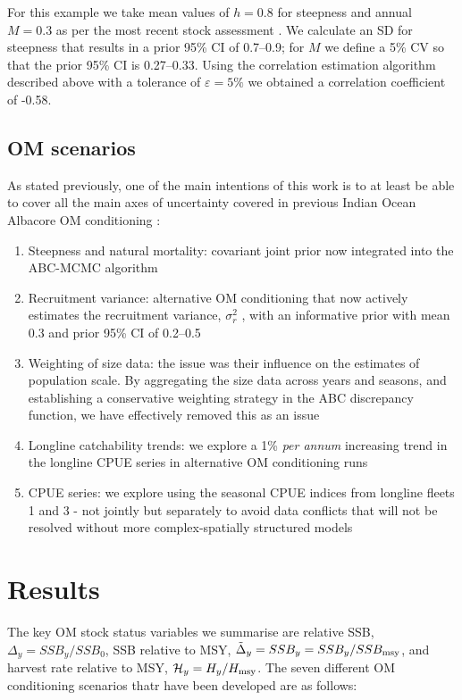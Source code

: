 \documentclass[11pt]{article}
\newcommand{\veps}{\varepsilon}
\newcommand{\sigr}{\sigma^2_r}
\begin{document}
For this example we take mean values of $h = 0.8$ for steepness and annual $M = 0.3$ as per the most recent stock assessment \cite{albsa}. We calculate an SD for steepness that results in a prior 95\% CI of 0.7--0.9; for $M$ we define a 5\% CV so that the prior 95\% CI is 0.27--0.33. Using the correlation estimation algorithm described above with a tolerance of $\veps = 5\%$ we obtained a correlation coefficient of -0.58.

\subsection{OM scenarios}

As stated previously, one of the main intentions of this work is to at least be able to cover all the main axes of uncertainty covered in previous Indian Ocean Albacore OM conditioning \cite{alb}:

\begin{enumerate}
    \item Steepness and natural mortality: covariant joint prior now integrated into the ABC-MCMC algorithm
    \item Recruitment variance: alternative OM conditioning that now actively estimates the recruitment variance, $\sigr$ , with an informative prior with mean 0.3 and prior 95\% CI of 0.2--0.5
    \item Weighting of size data: the issue was their influence on the estimates of population scale. By aggregating the size data across years and seasons, and establishing a conservative weighting strategy in the ABC discrepancy function, we have effectively removed this as an issue
    \item Longline catchability trends: we explore a 1\% \textit{per annum} increasing trend in the longline CPUE series in alternative OM conditioning runs
    \item CPUE series: we explore using the seasonal CPUE indices from longline fleets 1 and 3 - not jointly but separately to avoid data conflicts that will not be resolved without more complex-spatially structured models
\end{enumerate}

\section{Results}

The key OM stock status variables we summarise are relative SSB, $\Delta_y=SSB_y/SSB_0$, SSB relative to MSY, $\tilde{\Delta}_y=SSB_y=SSB_y/SSB_{\rm msy}$, and harvest rate relative to MSY, $\mathcal{H}_y=H_y/H_{\rm msy}$. The seven different OM conditioning scenarios thatr have been developed are as follows:
\end{document}
